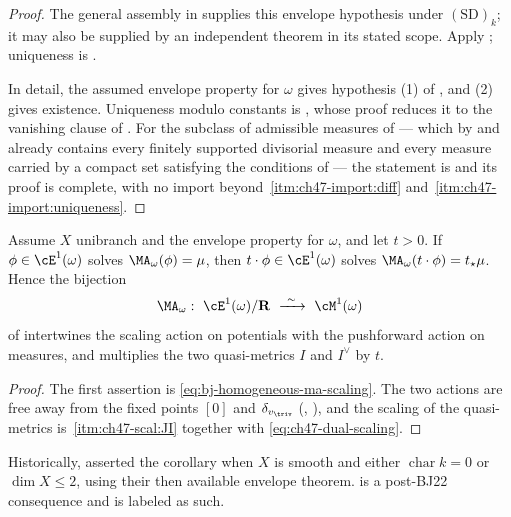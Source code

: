 \begin{proof}
The general assembly in
supplies this envelope hypothesis under $\mathrm{(SD)}_k$; it may also
be supplied by an independent theorem in its stated scope. Apply
; uniqueness is
.

In detail, the assumed envelope property for $\omega$ gives hypothesis (1)
of , and (2) gives existence.
Uniqueness modulo constants is , whose proof
reduces it to the vanishing clause of
.  For the subclass of admissible
measures of  --- which by
 and
 already contains every finitely
supported divisorial measure and every measure carried by a compact set satisfying the conditions of
--- the statement is  and its proof is
complete, with no import beyond
\,\cref{itm:ch47-import:diff}
and~\cref{itm:ch47-import:uniqueness}.
\end{proof}

\begin{corollary}
\label{cor:ch47-scaling-cy}
Assume $X$ unibranch and the envelope property for $\omega$, and let $t>0$. If
$\phi\in\cE^1(\omega)$ solves $\MA_\omega(\phi)=\mu$, then
$t\cdot\phi\in\cE^1(\omega)$ solves
$\MA_\omega(t\cdot\phi)=t_\star\mu$.  Hence the bijection
\[
 \MA_\omega:\ \cE^1(\omega)/\mathbf R\ \xrightarrow{\ \sim\ }\ \cM^1(\omega)
\]
of  intertwines the scaling action on potentials
with the pushforward action on measures, and multiplies the two
quasi-metrics $I$ and $I^\vee$ by $t$.
\end{corollary}

\begin{proof}
The first assertion is \eqref{eq:bj-homogeneous-ma-scaling}.  The two
actions are free away from the fixed points $[0]$ and
$\delta_{v_{\triv}}$ (,
), and the scaling of the quasi-metrics is
\,\cref{itm:ch47-scal:JI} together with
\eqref{eq:ch47-dual-scaling}.
\end{proof}

Historically, \cite[Theorem~12.9]{BJ22} asserted the corollary when $X$ is smooth
and either $\operatorname{char}k=0$ or $\dim X\leq2$, using their then
available envelope theorem.   is a
post-BJ22 consequence and is labeled as such.

